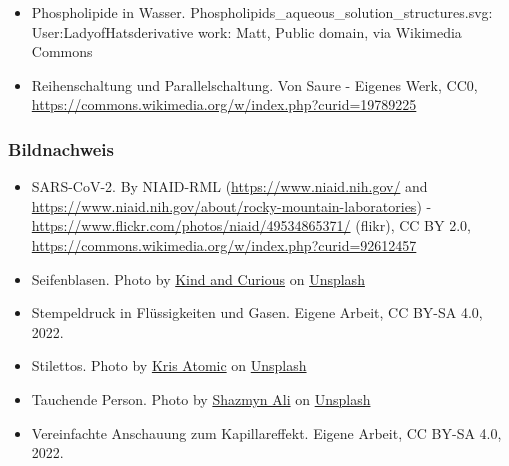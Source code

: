 \documentclass{beamer}
\begin{document}
\begin{frame}
\begin{tiny}
\begin{itemize}
\item
Phospholipide in Wasser. Phospholipids\_aqueous\_solution\_structures.svg: User:LadyofHatsderivative work: Matt, Public domain, via Wikimedia Commons

\item
Reihenschaltung und Parallelschaltung. Von Saure - Eigenes Werk, CC0, \url{https://commons.wikimedia.org/w/index.php?curid=19789225}

\end{itemize}
\end{tiny}
\end{frame}

\begin{frame}
\frametitle{Bildnachweis}
\begin{tiny}

\begin{itemize}
\item
SARS-CoV-2. By NIAID-RML (\url{https://www.niaid.nih.gov/} and \url{https://www.niaid.nih.gov/about/rocky-mountain-laboratories}) - \url{https://www.flickr.com/photos/niaid/49534865371/} (flikr), CC BY 2.0, \url{https://commons.wikimedia.org/w/index.php?curid=92612457}

\item
Seifenblasen. Photo by \href{https://unsplash.com/@kindandcurious?utm_source=unsplash&utm_medium=referral&utm_content=creditCopyText}{Kind and Curious} on \href{https://unsplash.com/s/photos/soap-bubble?utm_source=unsplash&utm_medium=referral&utm_content=creditCopyText}{Unsplash}  

\item

Stempeldruck in Flüssigkeiten und Gasen. Eigene Arbeit, CC BY-SA 4.0, 2022.
  

\item
Stilettos. Photo by \href{https://unsplash.com/@krisatomic?utm_source=unsplash&utm_medium=referral&utm_content=creditCopyText}{Kris Atomic} on \href{https://unsplash.com/s/photos/stiletto?utm_source=unsplash&utm_medium=referral&utm_content=creditCopyText}{Unsplash}
  

\item
Tauchende Person. Photo by \href{https://unsplash.com/@shazmynphotographer?utm_source=unsplash&utm_medium=referral&utm_content=creditCopyText}{Shazmyn Ali} on \href{https://unsplash.com/s/photos/diver?utm_source=unsplash&utm_medium=referral&utm_content=creditCopyText}{Unsplash}

\item
Vereinfachte Anschauung zum Kapillareffekt. Eigene Arbeit, CC BY-SA 4.0, 2022.
  

\end{itemize}
\end{tiny}
\end{frame}
\end{document}
